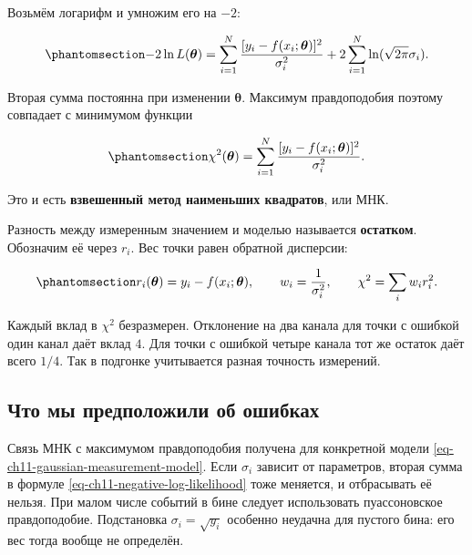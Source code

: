 \documentclass[
  russian,
  11pt,
  a4paper,
  open=any]{scrbook}
\begin{document}
Возьмём логарифм и умножим его на \(-2\):

\begin{equation}\protect\phantomsection\label{eq-ch11-negative-log-likelihood}{
-2\ln L(\boldsymbol\theta)=
\sum_{i=1}^{N}\frac{[y_i-f(x_i;\boldsymbol\theta)]^2}{\sigma_i^2}
+2\sum_{i=1}^{N}\ln(\sqrt{2\pi}\sigma_i).
}\end{equation}

Вторая сумма постоянна при изменении \(\boldsymbol\theta\). Максимум
правдоподобия поэтому совпадает с минимумом функции

\begin{equation}\protect\phantomsection\label{eq-weighted-least-squares}{
\chi^2(\boldsymbol\theta)=
\sum_{i=1}^{N}\frac{[y_i-f(x_i;\boldsymbol\theta)]^2}{\sigma_i^2}.
}\end{equation}

Это и есть \textbf{взвешенный метод наименьших квадратов}, или МНК.

Разность между измеренным значением и моделью называется
\textbf{остатком}. Обозначим её через \(r_i\). Вес точки равен обратной
дисперсии:

\begin{equation}\protect\phantomsection\label{eq-ch11-residuals-weights}{
r_i(\boldsymbol\theta)=y_i-f(x_i;\boldsymbol\theta),
\qquad
w_i=\frac1{\sigma_i^2},
\qquad
\chi^2=\sum_iw_i r_i^2.
}\end{equation}

Каждый вклад в \(\chi^2\) безразмерен. Отклонение на два канала для
точки с ошибкой один канал даёт вклад \(4\). Для точки с ошибкой четыре
канала тот же остаток даёт всего \(1/4\). Так в подгонке учитывается
разная точность измерений.

\subsection{Что мы предположили об
ошибках}\label{ux447ux442ux43e-ux43cux44b-ux43fux440ux435ux434ux43fux43eux43bux43eux436ux438ux43bux438-ux43eux431-ux43eux448ux438ux431ux43aux430ux445}

Связь МНК с максимумом правдоподобия получена для конкретной модели
\ref{eq-ch11-gaussian-measurement-model}. Если \(\sigma_i\) зависит от
параметров, вторая сумма в формуле \ref{eq-ch11-negative-log-likelihood}
тоже меняется, и отбрасывать её нельзя. При малом числе событий в бине
следует использовать пуассоновское правдоподобие. Подстановка
\(\sigma_i=\sqrt{y_i}\) особенно неудачна для пустого бина: его вес
тогда вообще не определён.
\end{document}
